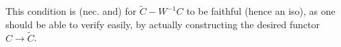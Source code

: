
This condition is (nec. and)  for $\widetilde C\mathbin{-}W^{-1}C$ to be faithful (hence an iso), as one should be able to verify easily, by actually constructing the desired functor $C\longrightarrow\widetilde C$.

